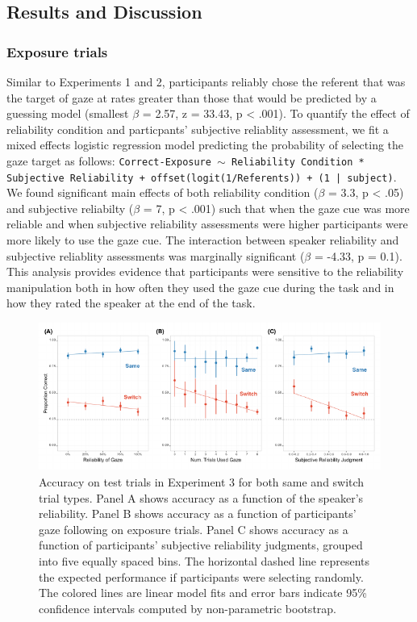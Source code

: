 \documentclass[authoryear, review]{elsarticle}
\newenvironment{CodeChunk}{}{}
\begin{document}
\subsection{Results and Discussion}\label{results-and-discussion-2}

\subsubsection{Exposure trials}\label{exposure-trials-2}

Similar to Experiments 1 and 2, participants reliably chose the referent
that was the target of gaze at rates greater than those that would be
predicted by a guessing model (smallest \(\beta\) = 2.57, z = 33.43, p
\textless{} .001). To quantify the effect of reliability condition and
particpants' subjective reliablity assessment, we fit a mixed effects
logistic regression model predicting the probability of selecting the
gaze target as follows:
\texttt{Correct-Exposure $\sim$ Reliability Condition * Subjective Reliability + offset(logit(1/Referents)) + (1 | subject)}.
We found significant main effects of both reliability condition
(\(\beta\) = 3.3, p \textless{} .05) and subjective reliabilty
(\(\beta\) = 7, p \textless{} .001) such that when the gaze cue was more
reliable and when subjective reliability assessments were higher
participants were more likely to use the gaze cue. The interaction
between speaker reliability and subjective reliablity assessments was
marginally significant (\(\beta\) = -4.33, p = 0.1). This analysis
provides evidence that participants were sensitive to the reliability
manipulation both in how often they used the gaze cue during the task
and in how they rated the speaker at the end of the task.

\begin{CodeChunk}
\begin{figure}[tb]
\includegraphics{figs/expt3-plot-1} \caption[Accuracy on test trials in Experiment 3 for both same and switch trial types]{Accuracy on test trials in Experiment 3 for both same and switch trial types. Panel A shows accuracy as a function of the speaker's reliability. Panel B shows accuracy as a function of participants' gaze following on exposure trials. Panel C shows accuracy as a function of participants' subjective reliability judgments, grouped into five equally spaced bins. The horizontal dashed line represents the expected performance if participants were selecting randomly. The colored lines are linear model fits and error bars indicate 95\% confidence intervals computed by non-parametric bootstrap.}\label{fig:expt3-plot}
\end{figure}
\end{CodeChunk}
\end{document}
